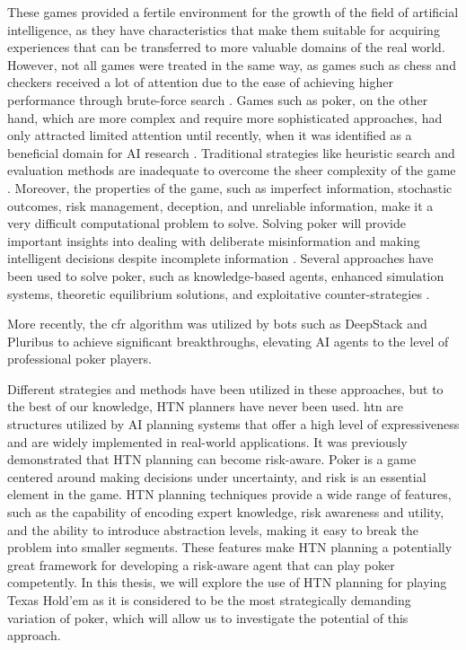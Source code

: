 These games provided a fertile environment for the growth of the field of artificial intelligence, as they have characteristics that make them suitable for acquiring experiences that can be transferred to more valuable domains of the real world. However, not all games were treated in the same way, as games such as chess and checkers received a lot of attention due to the ease of achieving higher performance through brute-force search \cite{billings1998poker}. Games such as poker, on the other hand, which are more complex and require more sophisticated approaches, had only attracted limited attention \cite{billings2006algorithms} until recently, when it was identified as a beneficial domain for AI research \cite{billings1998poker}. Traditional strategies like heuristic search and evaluation methods are inadequate to overcome the sheer complexity of the game \cite{billings_challenge_2002}. Moreover, the properties of the game, such as imperfect information, stochastic outcomes, risk management, deception, and unreliable information, make it a very difficult computational problem to solve. Solving poker will provide important insights into dealing with deliberate misinformation and making intelligent decisions despite incomplete information \cite{billings2006algorithms}. Several approaches have been used to solve poker, such as knowledge-based agents, enhanced simulation systems, theoretic equilibrium solutions, and exploitative counter-strategies \cite{rubin2011computer}.

More recently, the \gls{cfr} algorithm was utilized by bots such as DeepStack \cite{moravvcik2017deepstack} and Pluribus \cite{brown2019superhuman} to achieve significant breakthroughs, elevating AI agents to the level of professional poker players.

Different strategies and methods have been utilized in these approaches, but to the best of our knowledge, HTN planners have never been used. \gls{htn} are structures utilized by AI planning systems that offer a high level of expressiveness \cite{erol1994htn} and are widely implemented in real-world applications. It was previously \cite{alnazer2022risk} demonstrated that HTN planning can become risk-aware. Poker is a game centered around making decisions under uncertainty, and risk is an essential element in the game. HTN planning techniques provide a wide range of features, such as the capability of encoding expert knowledge, risk awareness and utility, and the ability to introduce abstraction levels, making it easy to break the problem into smaller segments. These features make HTN planning a potentially great framework for developing a risk-aware agent that can play poker competently. In this thesis, we will explore the use of HTN planning for playing Texas Hold'em as it is considered to be the most strategically demanding variation of poker, which will allow us to investigate the potential of this approach.


